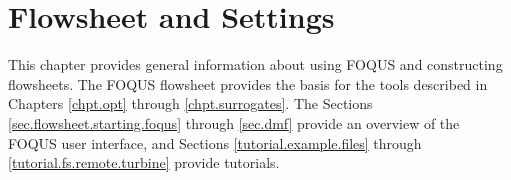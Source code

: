\chapter{Flowsheet and Settings}\label{chpt.flowsheet}

This chapter provides general information about using FOQUS and constructing flowsheets. The FOQUS flowsheet provides the basis for the tools described in Chapters \ref{chpt.opt} through \ref{chpt.surrogates}. The Sections \ref{sec.flowsheet.starting.foqus} through \ref{sec.dmf} provide an overview of the FOQUS user interface, and Sections \ref{tutorial.example.files} through \ref{tutorial.fs.remote.turbine} provide tutorials.






%







